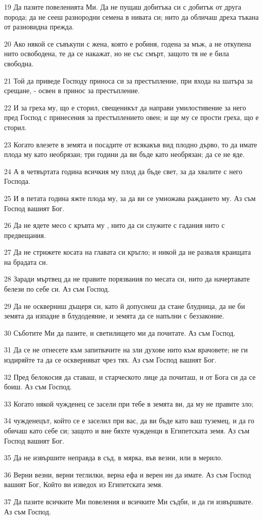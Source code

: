\par 19 Да пазите повеленията Ми. Да не пущаш добитъка си с добитък от друга порода; да не сееш разнородни семена в нивата си; нито да обличаш дреха тъкана от разновидна прежда.
\par 20 Ако някой се съвъкупи с жена, която е робиня, годена за мъж, а не откупена нито освободена, те да се накажат, но не със смърт, защото тя не е била свободна.
\par 21 Той да приведе Господу приноса си за престъпление, при входа на шатъра за срещане, - освен в принос за престъпление.
\par 22 И за греха му, що е сторил, свещеникът да направи умилостивение за него пред Господ с принесения за престъплението овен; и ще му се прости греха, що е сторил.
\par 23 Когато влезете в земята и посадите от всякакъв вид плодно дърво, то да имате плода му като необрязан; три години да ви бъде като необрязан; да се не яде.
\par 24 А в четвъртата година всичкия му плод да бъде свет, за да хвалите с него Господа.
\par 25 И в петата година яжте плода му, за да ви се умножава раждането му. Аз съм Господ вашият Бог.
\par 26 Да не ядете месо с кръвта му , нито да си служите с гадания нито с предвещания.
\par 27 Да не стрижете косата на главата си кръгло; и никой да не разваля краищата на брадата си.
\par 28 Заради мъртвец да не правите порязвания по месата си, нито да начертавате белези по себе си. Аз съм Господ.
\par 29 Да не оскверниш дъщеря си, като й допуснеш да стане блудница, да не би земята да изпадне в блудодеяние, и земята да се напълни с беззаконие.
\par 30 Съботите Ми да пазите, и светилището ми да почитате. Аз съм Господ.
\par 31 Да се не отнесете към запитвачите на зли духове нито към врачовете; не ги издиряйте та да се оскверняват чрез тях. Аз съм Господ вашият Бог.
\par 32 Пред белокосия да ставаш, и старческото лице да почиташ, и от Бога си да се боиш. Аз съм Господ.
\par 33 Когато някой чужденец се засели при тебе в земята ви, да му не правите зло;
\par 34 чужденецът, който се е заселил при вас, да ви бъде като ваш туземец, и да го обичаш като себе си; защото и вие бяхте чужденци в Египетската земя. Аз съм Господ вашият Бог.
\par 35 Да не извършите неправда в съд, в мярка, във везни, или в мерило.
\par 36 Верни везни, верни теглилки, верна ефа и верен ин да имате. Аз съм Господ вашият Бог, Който ви изведох из Египетската земя.
\par 37 Да пазите всичките Ми повеления и всичките Ми съдби, и да ги извършвате. Аз съм Господ.

